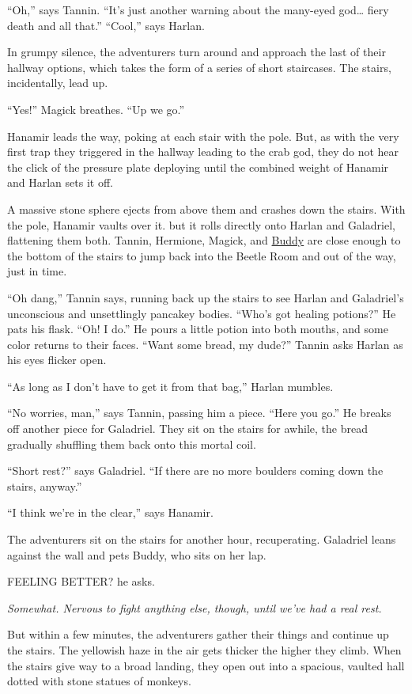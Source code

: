 \documentclass[smalldemyvopaper,11pt,twoside,onecolumn,openright,extrafontsizes]{memoir}
\begin{document}
``Oh,'' says Tannin. ``It's just another warning about the many-eyed
god\ldots{} fiery death and all that.'' ``Cool,'' says Harlan.

In grumpy silence, the adventurers turn around and approach the last of
their hallway options, which takes the form of a series of short
staircases. The stairs, incidentally, lead up.

``Yes!'' Magick breathes. ``Up we go.''

Hanamir leads the way, poking at each stair with the pole. But, as with
the very first trap they triggered in the hallway leading to the crab
god, they do not hear the click of the pressure plate deploying until
the combined weight of Hanamir and Harlan sets it off.

A massive stone sphere ejects from above them and crashes down the
stairs. With the pole, Hanamir vaults over it. but it rolls directly
onto Harlan and Galadriel, flattening them both. Tannin, Hermione,
Magick, and \href{/characters/buddy/}{Buddy} are close enough to the
bottom of the stairs to jump back into the Beetle Room and out of the
way, just in time.

``Oh dang,'' Tannin says, running back up the stairs to see Harlan and
Galadriel's unconscious and unsettlingly pancakey bodies. ``Who's got
healing potions?'' He pats his flask. ``Oh! I do.'' He pours a little
potion into both mouths, and some color returns to their faces. ``Want
some bread, my dude?'' Tannin asks Harlan as his eyes flicker open.

``As long as I don't have to get it from that bag,'' Harlan mumbles.

``No worries, man,'' says Tannin, passing him a piece. ``Here you go.''
He breaks off another piece for Galadriel. They sit on the stairs for
awhile, the bread gradually shuffling them back onto this mortal coil.

``Short rest?'' says Galadriel. ``If there are no more boulders coming
down the stairs, anyway.''

``I think we're in the clear,'' says Hanamir.

The adventurers sit on the stairs for another hour, recuperating.
Galadriel leans against the wall and pets Buddy, who sits on her lap.

FEELING BETTER? he asks.

\emph{Somewhat. Nervous to fight anything else, though, until we've had
a real rest.}

But within a few minutes, the adventurers gather their things and
continue up the stairs. The yellowish haze in the air gets thicker the
higher they climb. When the stairs give way to a broad landing, they
open out into a spacious, vaulted hall dotted with stone statues of
monkeys.
\end{document}
